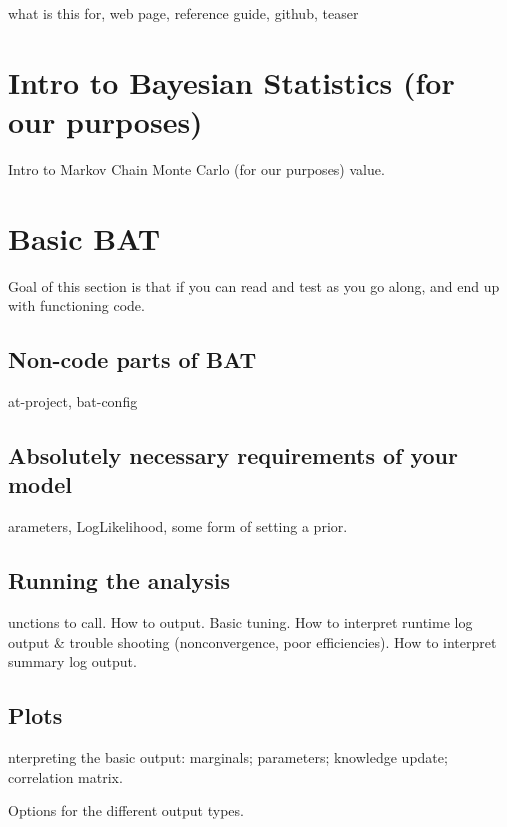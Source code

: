\documentclass[11pt, a4paper]{article}
\newcommand{\dan}[1]{{\color{red}{Dan: #1}}}
\newcommand{\fred}[1]{{\color{blue}{Fred: #1}}}
\begin{document}
what is this for, web page, reference guide, github, teaser

\section{Intro to Bayesian Statistics (for our purposes)}
\fred

\section{Intro to Markov Chain Monte Carlo (for our purposes)}
\fred

R value.

\section{Basic BAT}

Goal of this section is that if you can read and test as you go along, and end up with functioning code.

\subsection{Non-code parts of BAT}
\dan

bat-project, bat-config

\subsection{Absolutely necessary requirements of your model}
\dan

Parameters, LogLikelihood, some form of setting a prior.

\subsection{Running the analysis}
\dan

Functions to call. How to output. Basic tuning. How to interpret runtime log output \& trouble shooting (nonconvergence, poor efficiencies). How to interpret summary log output.

\subsection{Plots}
\dan

Interpreting the basic output: marginals; parameters; knowledge update; correlation matrix.

Options for the different output types.
\end{document}
